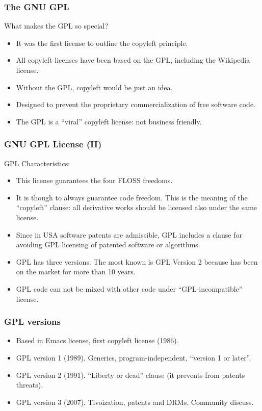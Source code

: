 \begin{frame}
\frametitle{The GNU GPL}

What makes the GPL so special?
\pause
\begin{itemize}
\item It was the first license to outline the copyleft principle.
\item All copyleft licenses have been based on the GPL, including the Wikipedia license.
\item Without the GPL, copyleft would be just an idea. 
\item Designed to prevent the proprietary commercialization of free software code.
\item The GPL is a ``viral'' copyleft license: not business friendly.
\end{itemize}

\end{frame}


\begin{frame}
\frametitle{GNU GPL License (II)}

GPL Characteristics:
\begin{itemize}
\item This license guarantees the four FLOSS freedoms.
\item It is though to always guarantee code freedom. This is the
  meaning of the ``copyleft'' clause: all derivative works should be
  licensed also under the same license.
\item Since in USA software patents are admissible, GPL includes a
  clause for avoiding GPL licensing of patented software or
  algorithms.
\item GPL has three versions. The most known is GPL Version 2 because
  has been on the market for more than 10 years. 
\item GPL code can not be mixed with other code under
  ``GPL-incompatible'' license.
\end{itemize}

\end{frame}


\begin{frame}
\frametitle{GPL versions}

\begin{itemize}
\item Based in Emacs license, first copyleft license (1986).
\item GPL version 1 (1989). Generics, program-independent, ``version 1 or later''.
\item GPL version 2 (1991). ``Liberty or dead'' clause (it prevents from patents threats).
\item GPL version 3 (2007). Tivoization, patents and DRMs. Community discuss.
\end{itemize}


\end{frame}


